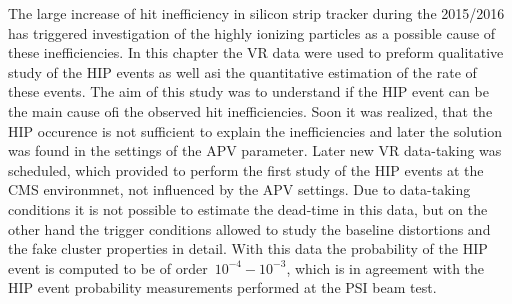 The large increase of hit inefficiency in silicon strip tracker during the 2015/2016 has triggered investigation of the highly ionizing particles as a possible cause of these inefficiencies. In this chapter the VR data were used to preform qualitative study of the HIP events as well asi the quantitative estimation of the rate of these events. The aim of this study was to understand if the HIP event can be the main cause ofi the observed hit inefficiencies. Soon it was realized, that the HIP occurence is not sufficient to explain the inefficiencies and later the solution was found in the settings of the APV parameter. Later new VR data-taking was scheduled, which provided to perform the first study of the HIP events at the CMS environmnet, not influenced by the APV settings. Due to data-taking conditions it is not possible to estimate the dead-time in this data, but on the other hand the trigger conditions allowed to study the baseline distortions and the fake cluster properties in detail. With this data the probability of the HIP event is computed to be of order~$10^{-4}-10^{-3}$, which is in agreement with the HIP event probability measurements performed at the PSI beam test.

\newpage

